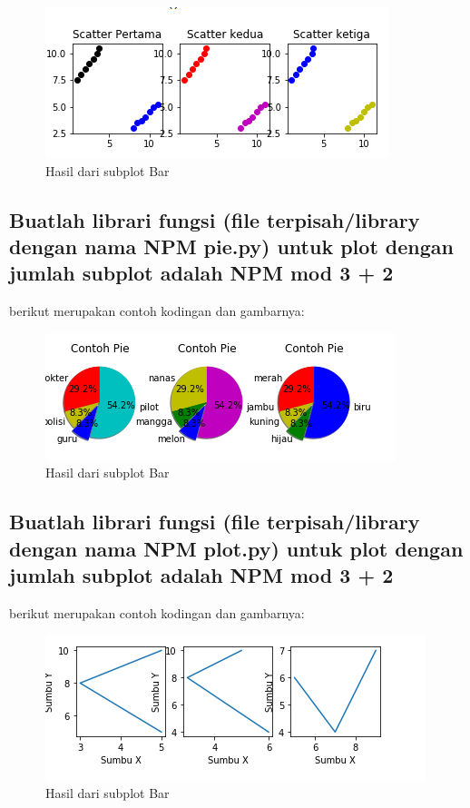 \begin{figure}[h]
\centering
\includegraphics[scale=0.9]{figures/6/1174012/scatter.png}
\caption{Hasil dari subplot Bar}
\label{fig:contoh}
\end{figure}
\subsection{Buatlah librari fungsi (ﬁle terpisah/library dengan nama NPM pie.py) untuk plot dengan jumlah subplot adalah NPM mod 3 + 2 }
berikut merupakan contoh kodingan dan gambarnya:


\begin{figure}[h]
\centering
\includegraphics[scale=0.9]{figures/6/1174012/pie.png}
\caption{Hasil dari subplot Bar}
\label{fig:contoh}
\end{figure}
\subsection{Buatlah librari fungsi (ﬁle terpisah/library dengan nama NPM plot.py) untuk plot dengan jumlah subplot adalah NPM mod 3 + 2 }
berikut merupakan contoh kodingan dan gambarnya:


\begin{figure}[h]
\centering
\includegraphics[scale=0.9]{figures/6/1174012/plott.png}
\caption{Hasil dari subplot Bar}
\end{figure}
